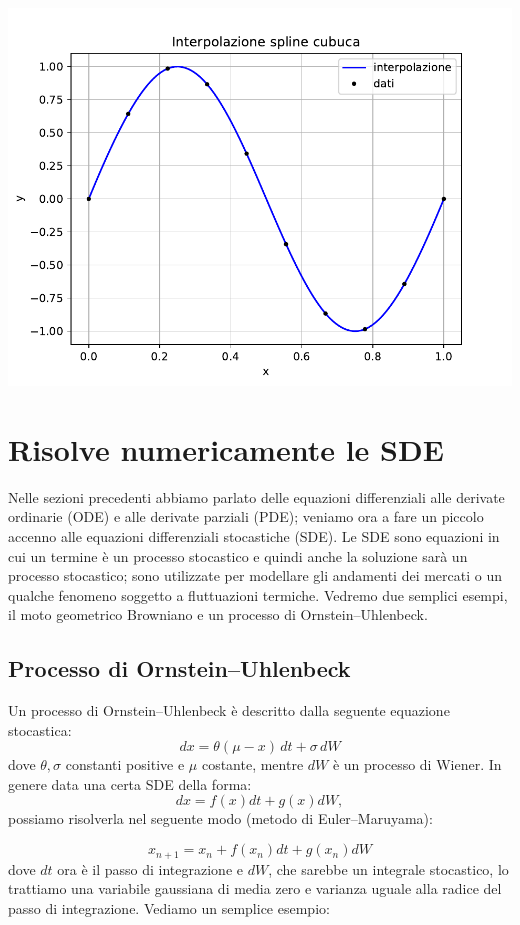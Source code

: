 \documentclass[10pt,a4paper]{article}
\begin{document}
\begin{center}
\includegraphics[scale=0.8]{img/int_spline.pdf}    
\end{center}


\newpage

\section{Risolve numericamente le SDE}
Nelle sezioni precedenti abbiamo parlato delle equazioni differenziali alle derivate ordinarie (ODE) e alle derivate parziali (PDE); veniamo ora a fare un piccolo accenno alle equazioni differenziali stocastiche (SDE). Le SDE sono equazioni in cui un termine è un processo stocastico e quindi anche la soluzione sarà un processo stocastico; sono utilizzate per modellare gli andamenti dei mercati o un qualche fenomeno soggetto a fluttuazioni termiche. Vedremo due semplici esempi, il moto geometrico Browniano e un processo di Ornstein–Uhlenbeck.

\subsection{Processo di Ornstein–Uhlenbeck}
Un processo di Ornstein–Uhlenbeck è descritto dalla seguente equazione stocastica:
\[
dx = \theta (\mu -  x) \, dt + \sigma \, dW
\]
dove $ \theta, \sigma$ constanti positive e $\mu$ costante, mentre $dW$ è un processo di Wiener. In genere data una certa SDE della forma:
\[
dx = f(x) dt + g(x) dW,
\]
possiamo risolverla nel seguente modo (metodo di Euler–Maruyama):

\[
x_{n+1} = x_n + f(x_n) dt + g(x_n) dW
\]
dove $dt$ ora è il passo di integrazione e $dW$, che sarebbe un integrale stocastico, lo trattiamo una variabile gaussiana di media zero e varianza uguale alla radice del passo di integrazione. Vediamo un semplice esempio:
\end{document}
